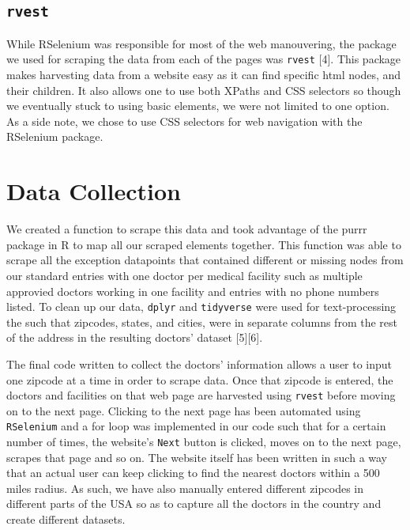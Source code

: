 \documentclass[10pt,letterpaper]{article}
\begin{document}
\hypertarget{rvest}{%
\subsection{\texorpdfstring{\texttt{rvest}}{rvest}}\label{rvest}}

While RSelenium was responsible for most of the web manouvering, the
package we used for scraping the data from each of the pages was
\texttt{rvest} {[}4{]}. This package makes harvesting data from a
website easy as it can find specific html nodes, and their children. It
also allows one to use both XPaths and CSS selectors so though we
eventually stuck to using basic elements, we were not limited to one
option. As a side note, we chose to use CSS selectors for web navigation
with the RSelenium package.

\hypertarget{data-collection}{%
\section{Data Collection}\label{data-collection}}

We created a function to scrape this data and took advantage of the
purrr package in R to map all our scraped elements together. This
function was able to scrape all the exception datapoints that contained
different or missing nodes from our standard entries with one doctor per
medical facility such as multiple approvied doctors working in one
facility and entries with no phone numbers listed. To clean up our data,
\texttt{dplyr} and \texttt{tidyverse} were used for text-processing the
such that zipcodes, states, and cities, were in separate columns from
the rest of the address in the resulting doctors' dataset
{[}5{]}{[}6{]}.

The final code written to collect the doctors' information allows a user
to input one zipcode at a time in order to scrape data. Once that
zipcode is entered, the doctors and facilities on that web page are
harvested using \texttt{rvest} before moving on to the next page.
Clicking to the next page has been automated using \texttt{RSelenium}
and a for loop was implemented in our code such that for a certain
number of times, the website's \texttt{Next} button is clicked, moves on
to the next page, scrapes that page and so on. The website itself has
been written in such a way that an actual user can keep clicking to find
the nearest doctors within a 500 miles radius. As such, we have also
manually entered different zipcodes in different parts of the USA so as
to capture all the doctors in the country and create different datasets.
\end{document}
